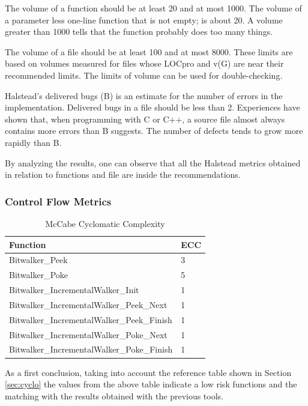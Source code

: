 The volume of a function should be at least 20 and at most 1000. The volume of a parameter less one-line function that is not empty; is about 20. A volume greater than 1000 tells that the function probably does too many things.

The volume of a file should be at least 100 and at most 8000. These limits are based on volumes measured for files whose LOCpro and v(G) are near their recommended limits. The limits of volume can be used for double-checking.

Halstead's delivered bugs (B) is an estimate for the number of errors in the implementation.
Delivered bugs in a file should be less than 2. 
Experiences have shown that, when programming with C or C++, a source file almost always contains more errors than B suggests. The number of defects tends to grow more rapidly than B.

By analyzing the results, one can observe that all the Halstead metrics obtained in relation to functions and file are inside the recommendations.


\subsubsection{Control Flow Metrics}
\begin{longtable}{||p{}|p{}||}
  \caption{McCabe Cyclomatic Complexity}\\
    \hline\hline
    \textbf{Function} &\textbf{ECC}\\
    \hline\hline
    \endhead
    \hline\hline
    \endfoot
    Bitwalker\_Peek & 3  
    \\
    \hline
    Bitwalker\_Poke & 5  
    \\
    \hline
    Bitwalker\_IncrementalWalker\_Init & 1
    \\
    \hline
    Bitwalker\_IncrementalWalker\_Peek\_Next & 1  
    \\
    \hline
    Bitwalker\_IncrementalWalker\_Peek\_Finish & 1  
    \\
    \hline
    Bitwalker\_IncrementalWalker\_Poke\_Next & 1  
    \\
    \hline
    Bitwalker\_IncrementalWalker\_Poke\_Finish & 1  
    \\
    \hline
   \end{longtable}

As a first conclusion, taking into account the reference table shown in Section \ref{sec:cyclo} the values from the above table indicate a low risk functions and the matching with the results obtained with the previous tools.

